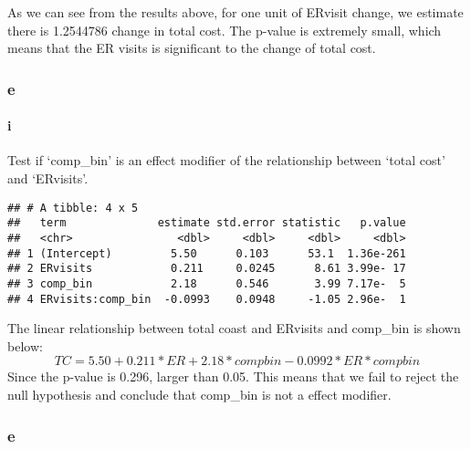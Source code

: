 \documentclass[]{article}
\newenvironment{Shaded}{\begin{snugshade}}{\end{snugshade}}
\newcommand{\KeywordTok}[1]{\textcolor[rgb]{0.13,0.29,0.53}{\textbf{#1}}}
\newcommand{\DataTypeTok}[1]{\textcolor[rgb]{0.13,0.29,0.53}{#1}}
\newcommand{\DecValTok}[1]{\textcolor[rgb]{0.00,0.00,0.81}{#1}}
\newcommand{\StringTok}[1]{\textcolor[rgb]{0.31,0.60,0.02}{#1}}
\newcommand{\OperatorTok}[1]{\textcolor[rgb]{0.81,0.36,0.00}{\textbf{#1}}}
\newcommand{\NormalTok}[1]{#1}
\let\oldparagraph\paragraph
\renewcommand{\paragraph}[1]{\oldparagraph{#1}\mbox{}}
\begin{document}
As we can see from the results above, for one unit of ERvisit change, we
estimate there is 1.2544786 change in total cost. The p-value is
extremely small, which means that the ER visits is significant to the
change of total cost.

\subsubsection{e}\label{e}

\paragraph{i}\label{i}

Test if `comp\_bin' is an effect modifier of the relationship between
`total cost' and `ERvisits'.

\begin{Shaded}
\end{Shaded}

\begin{verbatim}
## # A tibble: 4 x 5
##   term              estimate std.error statistic   p.value
##   <chr>                <dbl>     <dbl>     <dbl>     <dbl>
## 1 (Intercept)         5.50      0.103      53.1  1.36e-261
## 2 ERvisits            0.211     0.0245      8.61 3.99e- 17
## 3 comp_bin            2.18      0.546       3.99 7.17e-  5
## 4 ERvisits:comp_bin  -0.0993    0.0948     -1.05 2.96e-  1
\end{verbatim}

The linear relationship between total coast and ERvisits and comp\_bin
is shown below: \[
TC = 5.50 + 0.211*ER + 2.18*compbin - 0.0992*ER*compbin
\] Since the p-value is 0.296, larger than 0.05. This means that we fail
to reject the null hypothesis and conclude that comp\_bin is not a
effect modifier.

\subsubsection{e}\label{e-1}
\end{document}

